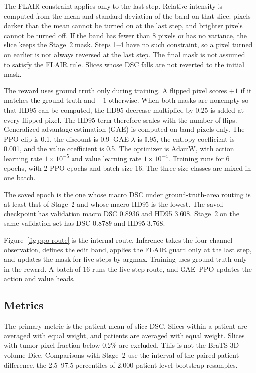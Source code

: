 \documentclass[runningheads]{llncs}
\begin{document}
The FLAIR constraint applies only to the last step. Relative intensity is computed from the mean and standard deviation of the band on that slice: pixels darker than the mean cannot be turned on at the last step, and brighter pixels cannot be turned off. If the band has fewer than 8 pixels or has no variance, the slice keeps the Stage~2 mask. Steps 1--4 have no such constraint, so a pixel turned on earlier is not always reversed at the last step. The final mask is not assumed to satisfy the FLAIR rule. Slices whose DSC falls are not reverted to the initial mask.

The reward uses ground truth only during training. A flipped pixel scores $+1$ if it matches the ground truth and $-1$ otherwise. When both masks are nonempty so that HD95 can be computed, the HD95 decrease multiplied by 0.25 is added at every flipped pixel. The HD95 term therefore scales with the number of flips. Generalized advantage estimation (GAE) is computed on band pixels only. The PPO clip is 0.1, the discount is 0.9, GAE $\lambda$ is 0.95, the entropy coefficient is 0.001, and the value coefficient is 0.5. The optimizer is AdamW, with action learning rate $1\times10^{-5}$ and value learning rate $1\times10^{-4}$. Training runs for 6 epochs, with 2 PPO epochs and batch size 16. The three size classes are mixed in one batch.

The saved epoch is the one whose macro DSC under ground-truth-area routing is at least that of Stage~2 and whose macro HD95 is the lowest. The saved checkpoint has validation macro DSC 0.8936 and HD95 3.608. Stage~2 on the same validation set has DSC 0.8789 and HD95 3.768.

Figure~\ref{fig:ppo-route} is the internal route. Inference takes the four-channel observation, defines the edit band, applies the FLAIR guard only at the last step, and updates the mask for five steps by argmax. Training uses ground truth only in the reward. A batch of 16 runs the five-step route, and GAE--PPO updates the action and value heads.

\subsection{Metrics}
The primary metric is the patient mean of slice DSC. Slices within a patient are averaged with equal weight, and patients are averaged with equal weight. Slices with tumor-pixel fraction below 0.2\% are excluded. This is not the BraTS 3D volume Dice. Comparisons with Stage~2 use the interval of the paired patient difference, the 2.5--97.5 percentiles of 2{,}000 patient-level bootstrap resamples.
\end{document}
